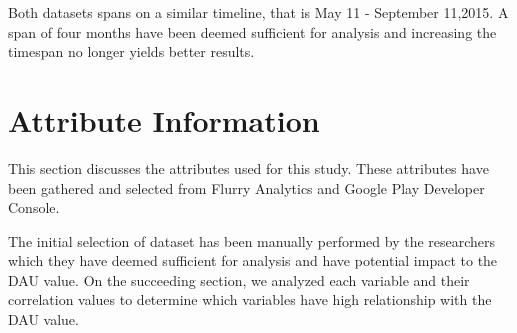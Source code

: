 Both datasets spans on a similar timeline, that is May 11 - September 11,2015. A span of four months have been deemed sufficient for analysis and increasing the timespan no longer yields better results.

\section{Attribute Information}
This section discusses the attributes used for this study. These attributes have been gathered and selected from Flurry Analytics and Google Play Developer Console. 

The initial selection of dataset has been manually performed by the researchers which they have deemed sufficient for analysis and have potential impact to the DAU value. On the succeeding section, we analyzed each variable and their correlation values to determine which variables have high relationship with the DAU value.

